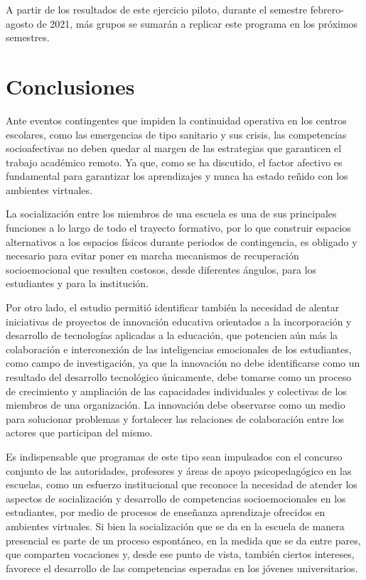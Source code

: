 \documentclass[spanish]{textolivre}
\begin{document}
A partir de los resultados de este ejercicio piloto, durante el semestre febrero-agosto de 2021, más grupos se sumarán a replicar este programa en los próximos semestres.

\section{Conclusiones}
Ante eventos contingentes que impiden la continuidad operativa en los centros escolares, como las emergencias de tipo sanitario y sus crisis, las competencias socioafectivas no deben quedar al margen de las estrategias que garanticen el trabajo académico remoto. Ya que, como se ha discutido, el factor afectivo es fundamental para garantizar los aprendizajes y nunca ha estado reñido con los ambientes virtuales.

La socialización entre los miembros de una escuela es una de sus principales funciones a lo largo de todo el trayecto formativo, por lo que construir espacios alternativos a los espacios físicos durante periodos de contingencia, es obligado y necesario para evitar poner en marcha mecanismos de recuperación socioemocional que resulten costosos, desde diferentes ángulos, para los estudiantes y para la institución.

Por otro lado, el estudio permitió identificar también la necesidad de alentar iniciativas de proyectos de innovación educativa orientados a la incorporación y desarrollo de tecnologías aplicadas a la educación, que potencien aún más la colaboración e interconexión de las inteligencias emocionales de los estudiantes, como campo de investigación, ya que la innovación  no debe identificarse como un resultado del desarrollo tecnológico únicamente, debe tomarse como un proceso de crecimiento y ampliación de las capacidades individuales y colectivas de los  miembros de una organización. La innovación debe observarse como un medio para solucionar problemas y fortalecer las relaciones de colaboración entre los actores que participan del mismo.

Es indispensable que programas de este tipo sean impulsados con el concurso conjunto de las autoridades, profesores y áreas de apoyo psicopedagógico en las escuelas, como un esfuerzo institucional que reconoce la necesidad de atender los aspectos de socialización y desarrollo de competencias socioemocionales en los estudiantes, por medio de procesos de enseñanza aprendizaje ofrecidos en ambientes virtuales. Si bien la socialización que se da en la escuela de manera presencial es parte de un proceso espontáneo, en la medida que se da entre pares, que comparten vocaciones y, desde ese punto de vista, también ciertos intereses, favorece el desarrollo de las competencias esperadas en los jóvenes universitarios. 
\end{document}

